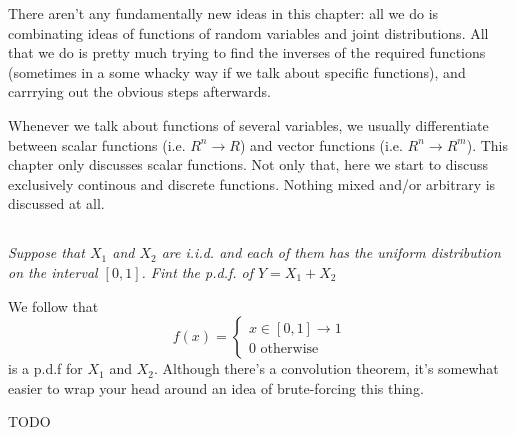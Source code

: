 \documentclass[11pt,oneside,titlepage]{book}
\begin{document}
There aren't any fundamentally new ideas in this chapter: all we do is
combinating ideas of functions of random variables and joint
distributions. All that we do is pretty much trying to find the
inverses of the required functions (sometimes in a some whacky way if
we talk about specific functions), and carrrying out the obvious
steps afterwards.

Whenever we talk about functions of several variables, we usually
differentiate between scalar functions (i.e. $R^n \to R$) and vector
functions (i.e. $R^n \to R^m$). This chapter only discusses scalar
functions. Not only that, here we start to discuss exclusively continous
and discrete functions. Nothing mixed and/or arbitrary is discussed at all.

\subsection{}

\textit{Suppose that $X_1$ and $X_2$ are i.i.d. and each of them has
  the uniform distribution on the interval $[0, 1]$. Fint the p.d.f. of $Y = X_1 + X_2$}

We follow that
$$f(x) =
\begin{cases}
  x \in [0, 1] \to 1 \\
  \text{0 otherwise}
  
\end{cases}
$$
is a p.d.f for $X_1$ and $X_2$. Although there's a convolution theorem, it's
somewhat easier to wrap your head around an idea of brute-forcing this thing.

TODO
\end{document}
